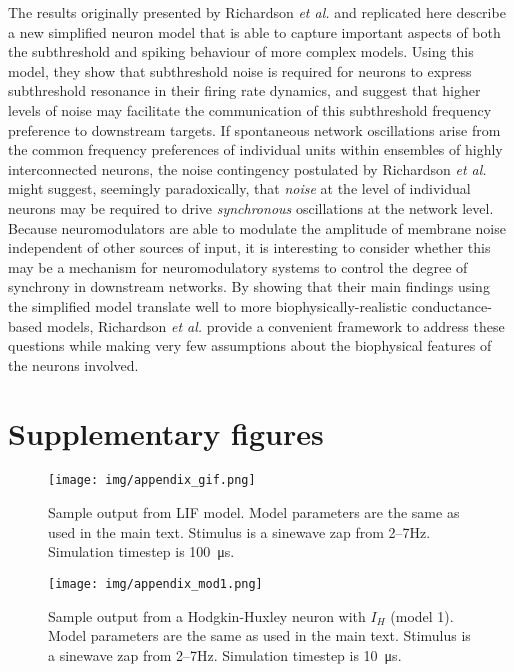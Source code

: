 \documentclass[12pt]{article}
\newcommand{\beginsupplement}{%
        \setcounter{table}{0}
        \renewcommand{\thetable}{S\arabic{table}}%
        \setcounter{figure}{0}
        \renewcommand{\thefigure}{S\arabic{figure}}%
     }
\begin{document}
The results originally presented by Richardson \textit{et al.} and replicated here describe a new simplified neuron model that is able to capture important aspects of both the subthreshold and spiking behaviour of more complex models.
Using this model, they show that subthreshold noise is required for neurons to express subthreshold resonance in their firing rate dynamics, and suggest that higher levels of noise may facilitate the communication of this subthreshold frequency preference to downstream targets.
If spontaneous network oscillations arise from the common frequency preferences of individual units within ensembles of highly interconnected neurons, the noise contingency postulated by Richardson \textit{et al.} might suggest, seemingly paradoxically, that \textit{noise} at the level of individual neurons may be required to drive \textit{synchronous} oscillations at the network level.
Because neuromodulators are able to modulate the amplitude of membrane noise independent of other sources of input, it is interesting to consider whether this may be a mechanism for neuromodulatory systems to control the degree of synchrony in downstream networks.
By showing that their main findings using the simplified model translate well to more biophysically-realistic conductance-based models, Richardson \textit{et al.} provide a convenient framework to address these questions while making very few assumptions about the biophysical features of the neurons involved.


\nocite{*}


\appendix
\beginsupplement
\singlespacing

\section{Supplementary figures}

\vfill
\begin{figure}[h!]
    \texttt{[image: img/appendix\_gif.png]}
    \caption[Sample traces from LIF neuron]{
        Sample output from LIF model.
        Model parameters are the same as used in the main text.
        Stimulus is a sinewave zap from 2--7Hz.
        Simulation timestep is \SI{100}{\micro\s}.
        }
    \label{fig:appendix_gif}
\end{figure}
\vfill

\begin{figure}
    \texttt{[image: img/appendix\_mod1.png]}
    \caption[Sample traces from neuron with $I_H$]{
        Sample output from a Hodgkin-Huxley neuron with $I_H$ (model 1).
        Model parameters are the same as used in the main text.
        Stimulus is a sinewave zap from 2--7Hz.
        Simulation timestep is \SI{10}{\micro\s}.
        }
    \label{fig:appendix_mod1}
\end{figure}
\end{document}
